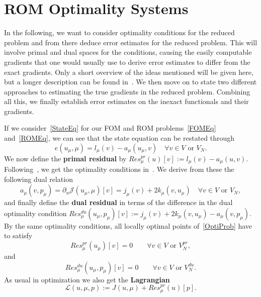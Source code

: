 \section{ROM Optimality Systems}\label{sec:ROMOptSys}

In the following, we want to consider optimality conditions for the reduced problem and from there deduce error estimates for the reduced problem.
This will involve primal and dual spaces for the conditions, causing the easily computable gradients that one would usually use to derive error estimates to differ from the exact gradients.
Only a short overview of the ideas mentioned will be given here, but a longer description can be found in~\cite[Section 3]{Keil2021}.
We then move on to state two different approaches to estimating the true gradients in the reduced problem.
Combining all this, we finally establish error estimates on the inexact functionals and their gradients.

If we consider~\eqref{StateEq} for our FOM and ROM problems~\eqref{FOMEq} and~\eqref{ROMEq}, we can see that the state equation can be restated through
\begin{equation*}
    e(u_\mu, \mu) = l_\mu(v) - a_\mu(u_\mu, v) \quad \forall v \in V \text{ or } V_N.
\end{equation*}
We now define the \textbf{primal residual} by $Res_\mu^{pr}(u)[v] := l_\mu(v) - a_\mu(u, v)$.
Following~\cite[Corollary 1.3]{Hinze2009}, we get the optimality conditions in~\cite[Proposition 2.9]{Keil2021}.
We derive from these the following dual relation
\begin{equation*}
    a_\mu(v, p_\mu) = \partial_u \mathcal{J}(u_\mu, \mu)[v] = j_\mu(v) + 2 k_\mu(v, u_\mu) \quad \forall v \in V \text{ or } V_N,
\end{equation*}
and finally define the \textbf{dual residual} in terms of the difference in the dual optimality condition $Res_\mu^{du}(u_\mu, p_\mu)[v] := j_\mu(v) + 2 k_\mu(v, u_\mu) - a_\mu(v, p_\mu)$.
By the same optimality conditions, all locally optimal points of~\eqref{OptiProb} have to satisfy
\begin{equation}\label{PrimalEq}
    Res_\mu^{pr}(u_\mu)[v] = 0 \qquad \forall v \in V \text{ or } V_N^{pr},
\end{equation}
and
\begin{equation}\label{DualEq}
    Res_\mu^{du}(u_\mu, p_\mu)[v] = 0 \qquad \forall v \in V \text{ or } V_N^{du}.
\end{equation}
As usual in optimization we also get the \textbf{Lagrangian}
\begin{equation*}
    \mathcal{L}(u, \mu, p) := J(u, \mu) + Res_\mu^{pr}(u)[p].
\end{equation*}

